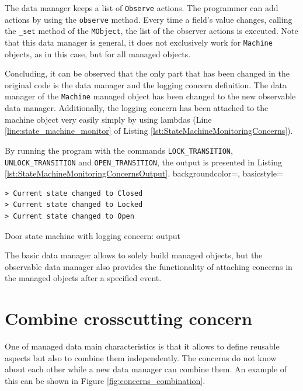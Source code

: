 The data manager keeps a list of \texttt{Observe} actions.
The programmer can add actions by using the \texttt{observe} method.
Every time a field's value changes, calling the \texttt{\_set} method of the \texttt{MObject}, the list of the observer actions is executed.
Note that this data manager is general, it does not exclusively work for \texttt{Machine} objects, as in this case, but for all managed objects.

Concluding, it can be observed that the only part that has been changed in the original code is the data manager and the logging concern definition.
The data manager of the \texttt{Machine} managed object has been changed to the new observable data manager.
Additionally, the logging concern has been attached to the machine object very easily simply by using lambdas (Line \ref{line:state_machine_monitor} of Listing \ref{lst:StateMachineMonitoringConcerns}).

By running the program with the commands \texttt{LOCK\_TRANSITION}, \texttt{UNLOCK\_TRANSITION} and \texttt{OPEN\_TRANSITION}, the output is presented in Listing \ref{lst:StateMachineMonitoringConcernsOutput}.
 {
    backgroundcolor=\color{white},
    basicstyle=\scriptsize\color{black}\ttfamily
}

\begin{sourcecode} [H]
	\lstset{numbers=none}
	\begin{lstlisting}[style=Bash]
> Current state changed to Closed
> Current state changed to Locked
> Current state changed to Open
	\end{lstlisting}
	\caption{Door state machine with logging concern: output}
	\label{lst:StateMachineMonitoringConcernsOutput}
\end{sourcecode}

The basic data manager allows to solely build managed objects, but the observable data manager also provides the functionality of attaching concerns in the managed objects after a specified event.

\section{Combine crosscutting concern}
One of managed data main characteristics is that it allows to define reusable aspects but also to combine them independently.
The concerns do not know about each other while a new data manager can combine them.
An example of this can be shown in Figure \ref{fig:concerns_combination}.

